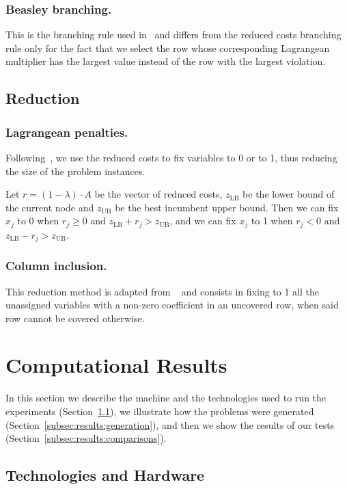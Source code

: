 \documentclass[runningheads]{llncs}
\begin{document}
\subsubsection{Beasley branching.} This is the branching rule used in~\cite{beasley-1987-algorithm} and differs from the reduced costs branching rule only for the fact that we select the row whose corresponding Lagrangean multiplier has the largest value instead of the row with the largest violation.

\subsection{Reduction}
\label{subsec:branch-bound:reduction}

\subsubsection{Lagrangean penalties.} Following~\cite{beasley-1987-algorithm}, we use the reduced costs to fix variables to 0 or to 1, thus reducing the size of the problem instances. 

Let $r = (1 - \lambda) \cdot A$ be the vector of reduced costs, $z_{\text{LB}}$ be the lower bound of the current node and $z_{\text{UB}}$ be the best incumbent upper bound. Then we can fix $x_j$ to 0 when $r_j \ge 0$ and $z_{\text{LB}} + r_j > z_{\text{UB}}$, and we can fix $x_j$ to 1 when $r_j < 0$ and $z_{\text{LB}} - r_j > z_{\text{UB}}$.  

\subsubsection{Column inclusion.} This reduction method is adapted from ~\cite{beasley-1987-algorithm} and consists in fixing to 1 all the unassigned variables with a non-zero coefficient in an uncovered row, when said row cannot be covered otherwise.

\section{Computational Results}
\label{sec:results}

In this section we describe the machine and the technologies used to run the experiments (Section~\ref{subsec:results:tech}), we illustrate how the problems were generated (Section~\ref{subsec:results:generation}), and then we show the results of our tests (Section~\ref{subsec:results:comparisons}).  

\subsection{Technologies and Hardware}
\label{subsec:results:tech}
\end{document}
